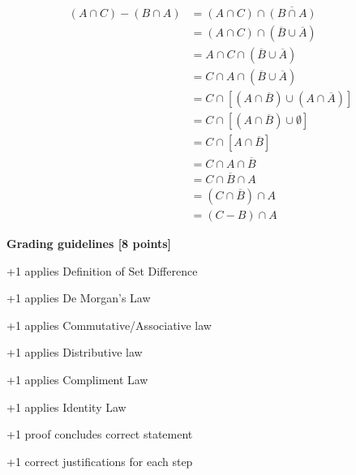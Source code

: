 \documentclass[12pt]{exam}
\begin{document}
\begin{solution}
\begin{align*}
    (A \cap C) - (B \cap A) &= (A \cap C) \cap \overline{(B \cap A)} \tag{Definition of Set Difference} \\
    &= (A \cap C) \cap (\overline{B} \cup \overline{A}) \tag{De Morgan's Law} \\
    &= A \cap C \cap (\overline{B} \cup \overline{A}) \tag{Associative Law} \\
    &= C \cap A \cap (\overline{B} \cup \overline{A}) \tag{Commutative Law} \\
    &= C \cap [(A \cap \overline{B}) \cup (A \cap \overline{A})] \tag{Distributive Law} \\
    &= C \cap [(A \cap \overline{B}) \cup \emptyset] \tag{Complement Law} \\
    &= C \cap [A \cap \overline{B}] \tag{Identity Law} \\
    &= C \cap A \cap \overline{B} \tag{Associative Law} \\
    &= C \cap \overline{B} \cap A \tag{Commutative Law} \\
    &= (C \cap \overline{B}) \cap A \tag{Associative Law} \\
    &= (C - B) \cap A \tag{Definition of Set Difference}
\end{align*}

\textbf{Grading guidelines [8 points]}
\begin{gwguidelines}
    \item +1 applies Definition of Set Difference
    \item +1 applies De Morgan's Law
    \item +1 applies Commutative/Associative law
    \item +1 applies Distributive law
    \item +1 applies Compliment Law
    \item +1 applies Identity Law
    \item +1 proof concludes correct statement
    \item +1 correct justifications for each step
\end{gwguidelines}
\end{solution}
\end{document}

